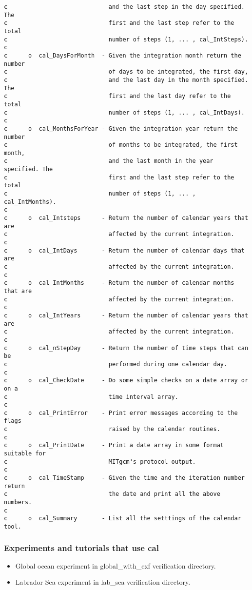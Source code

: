 {\begin{verbatim}
c                             and the last step in the day specified. The
c                             first and the last step refer to the total
c                             number of steps (1, ... , cal_IntSteps).
c
c      o  cal_DaysForMonth  - Given the integration month return the number
c                             of days to be integrated, the first day,
c                             and the last day in the month specified. The
c                             first and the last day refer to the total
c                             number of steps (1, ... , cal_IntDays).
c
c      o  cal_MonthsForYear - Given the integration year return the number
c                             of months to be integrated, the first month,
c                             and the last month in the year specified. The
c                             first and the last step refer to the total
c                             number of steps (1, ... , cal_IntMonths).
c
c      o  cal_Intsteps      - Return the number of calendar years that are
c                             affected by the current integration.
c
c      o  cal_IntDays       - Return the number of calendar days that are
c                             affected by the current integration.
c
c      o  cal_IntMonths     - Return the number of calendar months that are
c                             affected by the current integration.
c
c      o  cal_IntYears      - Return the number of calendar years that are
c                             affected by the current integration.
c
c      o  cal_nStepDay      - Return the number of time steps that can be
c                             performed during one calendar day.
c
c      o  cal_CheckDate     - Do some simple checks on a date array or on a
c                             time interval array.
c
c      o  cal_PrintError    - Print error messages according to the flags
c                             raised by the calendar routines.
c
c      o  cal_PrintDate     - Print a date array in some format suitable for
c                             MITgcm's protocol output.
c
c      o  cal_TimeStamp     - Given the time and the iteration number return
c                             the date and print all the above numbers.
c
c      o  cal_Summary       - List all the setttings of the calendar tool.
\end{verbatim}
}


\subsubsection{Experiments and tutorials that use cal}
\label{sec:pkg:cal:experiments}

\begin{itemize}
\item{Global ocean experiment in global\_with\_exf verification directory. }
\item{Labrador Sea experiment in lab\_sea verification directory. }
\end{itemize}

